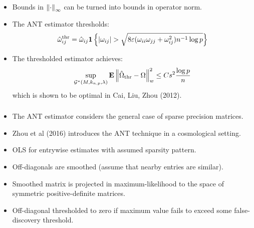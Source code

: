 \begin{frame}[fragile] \frametitle{}
    \begin{itemize}
        \item Bounds in $\left\lVert\cdot\right\rVert_\infty$ can be turned into bounds
            in operator norm.
        \item The ANT estimator thresholds:
            $$\hat\omega_{ij}^\mathrm{thr} =
            \hat\omega_{ij}\mathbf{1}\left\{|\omega_{ij}| >
            \sqrt{8\varepsilon(\omega_{ii} \omega_{jj} +
            \omega_{ij}^2)n^{-1}\log p}\right\}$$
        \item The thresholded estimator achieves:
            $$
            \sup_{\mathcal{G}^*(M, k_{n, p}, \lambda)}
            \mathbf{E}\left\lVert\hat\Omega_\mathrm{thr} - \Omega\right\rVert^2_w \leq
            Cs^2\frac{\log p}{n}
            $$
            which is shown to be optimal in Cai, Liu, Zhou (2012).
    \end{itemize}
\end{frame}
\begin{frame}[fragile] \frametitle{}
\end{frame}
\begin{frame}[fragile] \frametitle{}
    \begin{itemize}
        \item The ANT estimator considers the general case of sparse precision
            matrices.
        \item Zhou et al (2016) introduces the ANT technique in a cosmological
            setting.
        \item OLS for entrywise estimates with assumed sparsity pattern.
        \item Off-diagonals are smoothed (assume that nearby entries are
            similar).
        \item Smoothed matrix is projected in maximum-likelihood to the space
            of symmetric positive-definite matrices.
        \item Off-diagonal thresholded to zero if maximum value fails to exceed
            some false-discovery threshold.
    \end{itemize}
\end{frame}
